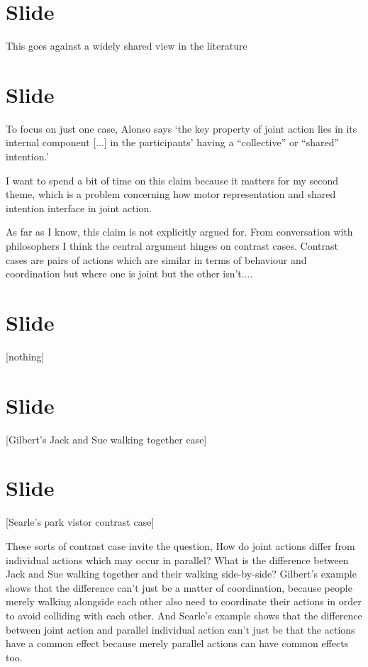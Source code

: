 \documentclass[12pt,\papersize]{extarticle}
\begin{document}
\section{Slide}
This goes against a widely shared view in the literature



\section{Slide}
To focus on just one case, Alonso says ‘the key property of joint action lies in its internal component [...] in the participants’ having a “collective” or “shared” intention.’ \citep[pp.\ 444-5]{alonso_shared_2009}

I want to spend a bit of time on this claim because it matters for my second theme, which is a problem concerning how motor representation and shared intention interface in joint action.

As far as I know, this claim is not explicitly argued for.  From conversation with philosophers I think the central argument hinges on  contrast cases.
Contrast cases are pairs of actions which are similar in terms of behaviour and coordination but where one is joint but the other isn’t....



\section{Slide}
[nothing]


\section{Slide}
[Gilbert's Jack and Sue walking together case]


\section{Slide}
[Searle's park vistor contrast case]

These sorts of contrast case invite the question, 
How do joint actions differ from individual actions which may occur in parallel? 
What is the difference between Jack and Sue walking together and their walking side-by-side?  
Gilbert’s example shows that the difference can’t just be a matter of coordination, because people merely walking alongside each other also need to coordinate their actions in order to avoid colliding with each other.  
And Searle’s example shows that the difference between joint action and parallel individual action can’t just be that the actions have a common effect because merely parallel actions can have common effects too. 
\end{document}
